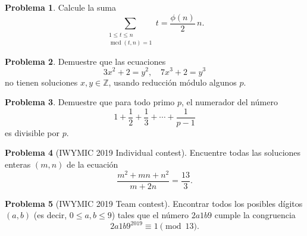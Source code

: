 \documentclass{article}
\newcommand{\ZZ}{\mathbb{Z}}
\DeclareMathOperator{\mcd}{mcd}
\theoremstyle{definition}
\newtheorem{problema}{Problema}
\begin{document}
\begin{problema}
  Calcule la suma
  $$\sum_{\substack{1 \le t \le n \\ \mcd (t,n) = 1}} t = \frac{\phi(n)}{2}\,n.$$
\end{problema}

\begin{problema}
  Demuestre que las ecuaciones
  $$3x^2 + 2 = y^2, \quad 7x^3 + 2 = y^3$$
  no tienen soluciones $x,y \in \ZZ$, usando reducción módulo algunos $p$.
\end{problema}

\begin{problema}
  Demuestre que para todo primo $p$, el numerador del número
  $$1 + \frac{1}{2} + \frac{1}{3} + \cdots + \frac{1}{p-1}$$
  es divisible por $p$.
\end{problema}

\begin{problema}[IWYMIC 2019 Individual contest]
  Encuentre todas las soluciones enteras $(m,n)$ de la ecuación
  $$\frac{m^2 + mn + n^2}{m + 2n} = \frac{13}{3}.$$
\end{problema}

\begin{problema}[IWYMIC 2019 Team contest]
  Encontrar todos los posibles dígitos $(a,b)$ (es decir, $0 \le a, b \le 9$)
  tales que el número $2a1b9$ cumple la congruencia
  $$2a1b9^{2019} \equiv 1 \pmod{13}.$$
\end{problema}
\end{document}
